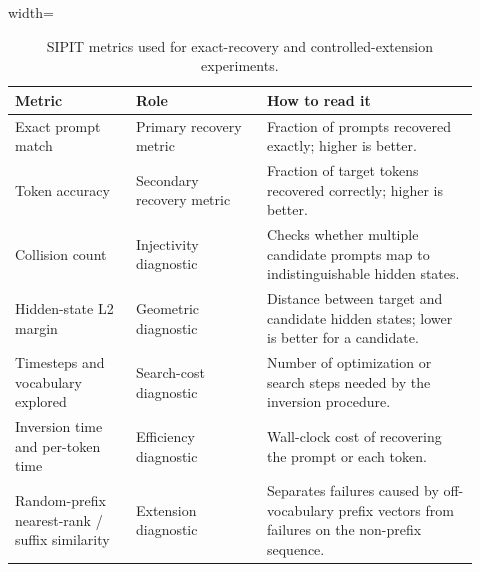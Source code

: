 \documentclass[12pt,a4paper,twoside,openright]{book}
\begin{document}
\begin{table}[!htb]
    \centering
    \scriptsize
    \begin{adjustbox}{width=\textwidth}
    \begin{tabular}{p{0.24\linewidth} p{0.26\linewidth} p{0.42\linewidth}}
        \toprule
        \textbf{Metric} & \textbf{Role} & \textbf{How to read it} \\
        \midrule
        Exact prompt match &
        Primary recovery metric &
        Fraction of prompts recovered exactly; higher is better. \\
        Token accuracy &
        Secondary recovery metric &
        Fraction of target tokens recovered correctly; higher is better. \\
        Collision count &
        Injectivity diagnostic &
        Checks whether multiple candidate prompts map to indistinguishable hidden states. \\
        Hidden-state L2 margin &
        Geometric diagnostic &
        Distance between target and candidate hidden states; lower is better for a candidate. \\
        Timesteps and vocabulary explored &
        Search-cost diagnostic &
        Number of optimization or search steps needed by the inversion procedure. \\
        Inversion time and per-token time &
        Efficiency diagnostic &
        Wall-clock cost of recovering the prompt or each token. \\
        Random-prefix nearest-rank / suffix similarity &
        Extension diagnostic &
        Separates failures caused by off-vocabulary prefix vectors from failures on the non-prefix sequence. \\
        \bottomrule
    \end{tabular}
    \end{adjustbox}
    \caption{SIPIT metrics used for exact-recovery and controlled-extension
    experiments.}
    \label{tab:sipit-metrics}
\end{table}
\end{document}

